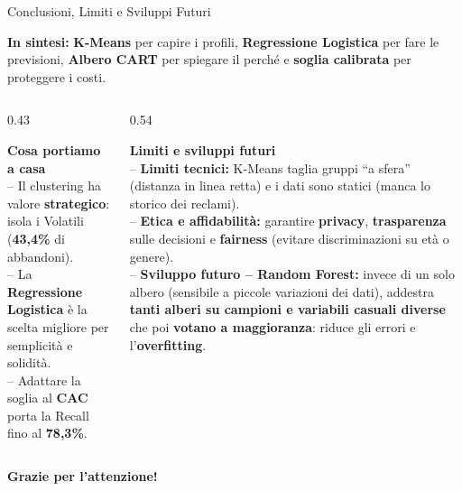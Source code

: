 \documentclass[aspectratio=169, 10pt]{beamer}
\newcommand{\card}[3]{%
    \colorbox{#1}{\parbox{\dimexpr#2-2\fboxsep\relax}{\raggedright #3}}%
}
\begin{document}
\begin{frame}{Conclusioni, Limiti e Sviluppi Futuri}
    \card{CardBlue}{\textwidth}{\footnotesize
        \textbf{\color{PrimaryNavy} In sintesi:} \textbf{K-Means} per capire i profili, \textbf{Regressione Logistica} per fare le previsioni, \textbf{Albero CART} per spiegare il perché e \textbf{soglia calibrata} per proteggere i costi.
    }

    \vspace{2.4mm}
    \begin{columns}[T, onlytextwidth]
        \begin{column}{0.43\textwidth}
            \card{CardGreen}{\linewidth}{\footnotesize
                \textbf{\color{AccentGreen}\small Cosa portiamo a casa}\\[3pt]
                -- Il clustering ha valore \textbf{strategico}: isola i Volatili (\textbf{43,4\%} di abbandoni).\\[3pt]
                -- La \textbf{Regressione Logistica} è la scelta migliore per semplicità e solidità.\\[3pt]
                -- Adattare la soglia al \textbf{CAC} porta la Recall fino al \textbf{78,3\%}.
            }
        \end{column}

        \begin{column}{0.54\textwidth}
            \card{CardAmber}{\linewidth}{\scriptsize
                \textbf{\color{AccentAmber}\small Limiti e sviluppi futuri}\\[2.2pt]
                -- \textbf{Limiti tecnici:} K-Means taglia gruppi ``a sfera'' (distanza in linea retta) e i dati sono statici (manca lo storico dei reclami).\\[2.2pt]
                -- \textbf{Etica e affidabilità:} garantire \textbf{privacy}, \textbf{trasparenza} sulle decisioni e \textbf{fairness} (evitare discriminazioni su età o genere).\\[2.2pt]
                -- \textbf{Sviluppo futuro -- Random Forest:} invece di un solo albero (sensibile a piccole variazioni dei dati), addestra \textbf{tanti alberi su campioni e variabili casuali diverse} che poi \textbf{votano a maggioranza}: riduce gli errori e l'\textbf{overfitting}.
            }
        \end{column}
    \end{columns}

    \vspace{3mm}
    \centering
    \colorbox{PrimaryNavy}{\parbox{0.98\textwidth}{\centering\vspace{1.5pt}
        \normalsize \color{white} \textbf{Grazie per l'attenzione!}
    \vspace{1.5pt}}}
\end{frame}
\end{document}
